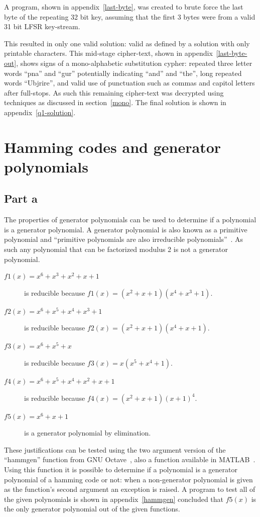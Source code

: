 \documentclass[pdftex, 12pt, a4paper]{article}
\begin{document}
A program, shown in appendix~\ref{last-byte}, was created to brute force the
last byte of the repeating 32 bit key, assuming that the first 3 bytes were from
a valid 31 bit LFSR key-stream.

This resulted in only one valid solution: valid as defined by a solution with
only printable characters.  This mid-stage cipher-text, shown in
appendix~\ref{last-byte-out}, shows signs of a mono-alphabetic substitution
cypher: repeated three letter words ``pna'' and ``gur'' potentially indicating
``and'' and ``the'', long repeated words ``Ubjrire'', and valid use of
punctuation such as commas and capitol letters after full-stops. As such this
remaining cipher-text was decrypted using techniques as discussed in
section~\ref{mono}.  The final solution is shown in appendix~\ref{q1-solution}.

\section{Hamming codes and generator polynomials}
\subsection{Part a}
The properties of generator polynomials can be used to determine if a polynomial
is a generator polynomial.  A generator polynomial is also known as a primitive
polynomial and ``primitive polynomials are also irreducible
polynomials''~\cite{wolfram-primative}.  As such any polynomial that can be
factorized modulus 2 is not a generator polynomial.

\begin{description}
    \item[$f1(x) = x^6 + x^3 + x^2 + x + 1$] is reducible because $f1(x) = (x^2+x+1)(x^4+x^3+1)$.
    \item[$f2(x) = x^6 + x^5 + x^4 + x^3 + 1$] is reducible because $f2(x) = (x^2+x+1)(x^4+x+1)$.
    \item[$f3(x) = x^6 + x^5 + x$] is reducible because $f3(x) = x(x^5 + x^4 + 1)$.
    \item[$f4(x) = x^6 + x^5 +x^4 + x^2 +x + 1$] is reducible because $f4(x) = (x^2+x+1)(x+1)^4$.
    \item[$f5(x) = x^6 + x + 1$] is a generator polynomial by elimination.
\end{description}

These justifications can be tested using the two argument version of the
``hammgen'' function from GNU Octave~\cite{hammgen-octave}, also a function
available in MATLAB~\cite{hammgen-matlab}. Using this function it is possible to
determine if a polynomial is a generator polynomial of a hamming code or not:
when a non-generator polynomial is given as the function's second argument an
exception is raised.  A program to test all of the given polynomials is shown in
appendix~\ref{hammgen} concluded that $f5(x)$ is the only generator polynomial
out of the given functions.
\end{document}
